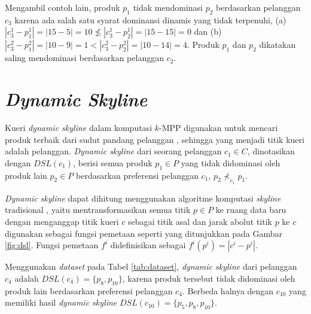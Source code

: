 Mengambil contoh lain, produk $p_1$ tidak mendominasi $p_2$ berdasarkan pelanggan $c_3$ karena ada salah satu syarat dominansi dinamis yang tidak terpenuhi, (a) $|c_3^1 - p_1^1| = |15-5| = 10 \nleq |c_3^1 - p_2^1| = |15-15| = 0$ dan (b) $|c_3^2 - p_1^2| = |10-9| = 1 < |c_3^2 - p_2^2| = |10-14| = 4$. Produk $p_1$ dan $p_2$ dikatakan saling mendominasi berdasarkan pelanggan $c_2$.

\section{\textit{Dynamic Skyline}}
\tab Kueri \textit{dynamic skyline} dalam komputasi $k$-MPP digunakan untuk mencari produk terbaik dari sudut pandang pelanggan \cite{kmpp}, sehingga yang menjadi titik kueri adalah pelanggan. \textit{Dynamic skyline} \cite{dynamic-skyline} dari seorang pelanggan $c_1 \in C$, dinotasikan dengan $DSL(c_1)$, berisi semua produk $p_1 \in P$ yang tidak didominasi oleh produk lain $p_2 \in P$ berdasarkan preferensi pelanggan $c_1$, $p_2 \nprec_{c_1} p_1$.

\textit{Dynamic skyline} dapat dihitung menggunakan algoritme komputasi \textit{skyline} tradisional \cite{skyline}, yaitu mentransformasikan semua titik $p \in P$ ke ruang data baru dengan menganggap titik kueri $c$ sebagai titik asal dan jarak abolut titik $p$ ke $c$ digunakan sebagai fungsi pemetaan seperti yang ditunjukkan pada Gambar \ref{fig:dsl}. Fungsi pemetaan $f^i$ didefinisikan sebagai $f^i (p^i) = |c^i-p^i|$.

Menggunakan \textit{dataset} pada Tabel \ref{tab:dataset}, \textit{dynamic skyline} dari pelanggan $c_4$ adalah $DSL(c_4) = \{p_8, p_{10}\}$, karena produk tersebut tidak didominasi oleh produk lain berdasarkan preferensi pelanggan $c_4$. Berbeda halnya dengan $c_{10}$ yang memiliki hasil \textit{dynamic skyline} $DSL(c_{10}) = \{p_5, p_8, p_{10}\}$.

